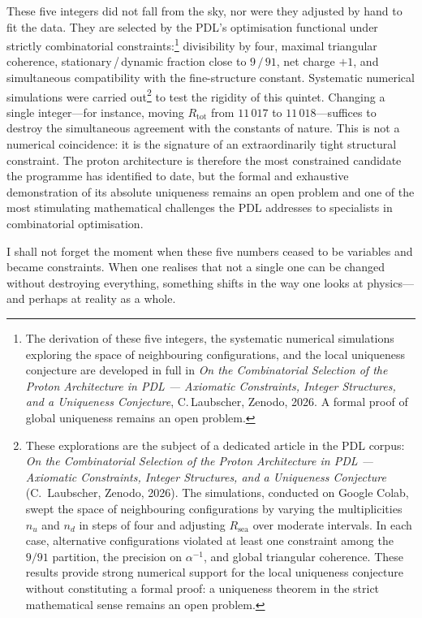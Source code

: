 \documentclass[12pt, a4paper, openright]{book}
\begin{document}
These five integers did not fall from the sky, nor were they adjusted by hand to fit the data. They are selected by the PDL's optimisation functional under strictly combinatorial constraints:\footnote{The derivation of these five integers, the systematic numerical simulations exploring the space of neighbouring configurations, and the local uniqueness conjecture are developed in full in \textit{On the Combinatorial Selection of the Proton Architecture in PDL --- Axiomatic Constraints, Integer Structures, and a Uniqueness Conjecture}, C.\,Laubscher, Zenodo, 2026. A formal proof of global uniqueness remains an open problem.} divisibility by four, maximal triangular coherence, stationary\,/\,dynamic fraction close to $9\,/\,91$, net charge $+1$, and simultaneous compatibility with the fine-structure constant. Systematic numerical simulations were carried out\footnote{These explorations are the subject of a dedicated article in the PDL corpus: \textit{On the Combinatorial Selection of the Proton Architecture in PDL --- Axiomatic Constraints, Integer Structures, and a Uniqueness Conjecture} (C.\ Laubscher, Zenodo, 2026). The simulations, conducted on Google Colab, swept the space of neighbouring configurations by varying the multiplicities $n_u$ and $n_d$ in steps of four and adjusting $R_\text{sea}$ over moderate intervals. In each case, alternative configurations violated at least one constraint among the $9/91$ partition, the precision on $\alpha^{-1}$, and global triangular coherence. These results provide strong numerical support for the local uniqueness conjecture without constituting a formal proof: a uniqueness theorem in the strict mathematical sense remains an open problem.} to test the rigidity of this quintet. Changing a single integer---for instance, moving $R_\text{tot}$ from $11\,017$ to $11\,018$---suffices to destroy the simultaneous agreement with the constants of nature. This is not a numerical coincidence: it is the signature of an extraordinarily tight structural constraint. The proton architecture is therefore the most constrained candidate the programme has identified to date, but the formal and exhaustive demonstration of its absolute uniqueness remains an open problem and one of the most stimulating mathematical challenges the PDL addresses to specialists in combinatorial optimisation.

\medskip

I shall not forget the moment when these five numbers ceased to be variables and became constraints. When one realises that not a single one can be changed without destroying everything, something shifts in the way one looks at physics---and perhaps at reality as a whole.
\end{document}
